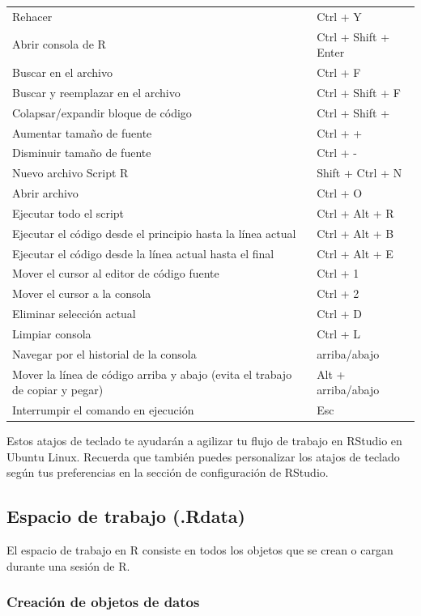 \documentclass[
  letterpaper,
  DIV=11,
  numbers=noendperiod]{scrartcl}
\begin{document}
\begin{longtable}[]{@{}
  >{\raggedright\arraybackslash}p{}
  >{\raggedright\arraybackslash}p{}@{}}
Rehacer & Ctrl + Y \\
Abrir consola de R & Ctrl + Shift + Enter \\
Buscar en el archivo & Ctrl + F \\
Buscar y reemplazar en el archivo & Ctrl + Shift + F \\
Colapsar/expandir bloque de código & Ctrl + Shift + \\
Aumentar tamaño de fuente & Ctrl + + \\
Disminuir tamaño de fuente & Ctrl + - \\
Nuevo archivo Script R & Shift + Ctrl + N \\
Abrir archivo & Ctrl + O \\
Ejecutar todo el script & Ctrl + Alt + R \\
Ejecutar el código desde el principio hasta la línea actual & Ctrl + Alt
+ B \\
Ejecutar el código desde la línea actual hasta el final & Ctrl + Alt +
E \\
Mover el cursor al editor de código fuente & Ctrl + 1 \\
Mover el cursor a la consola & Ctrl + 2 \\
Eliminar selección actual & Ctrl + D \\
Limpiar consola & Ctrl + L \\
Navegar por el historial de la consola & arriba/abajo \\
Mover la línea de código arriba y abajo (evita el trabajo de copiar y
pegar) & Alt + arriba/abajo \\
Interrumpir el comando en ejecución & Esc \\
\end{longtable}

Estos atajos de teclado te ayudarán a agilizar tu flujo de trabajo en
RStudio en Ubuntu Linux. Recuerda que también puedes personalizar los
atajos de teclado según tus preferencias en la sección de configuración
de RStudio.

\hypertarget{espacio-de-trabajo-.rdata}{%
\subsection{Espacio de trabajo
(.Rdata)}\label{espacio-de-trabajo-.rdata}}

El espacio de trabajo en R consiste en todos los objetos que se crean o
cargan durante una sesión de R.

\hypertarget{creaciuxf3n-de-objetos-de-datos}{%
\subsubsection{Creación de objetos de
datos}\label{creaciuxf3n-de-objetos-de-datos}}
\end{document}
